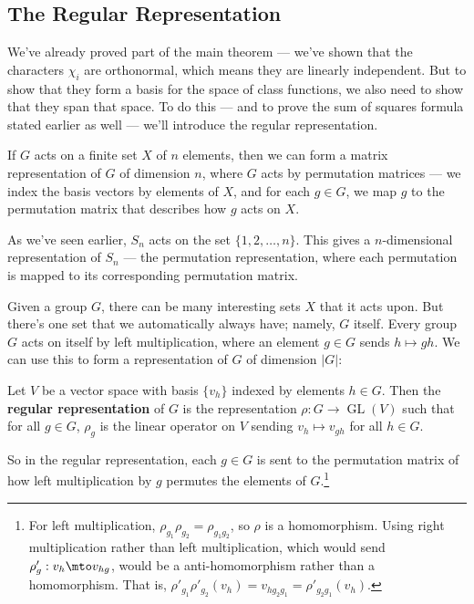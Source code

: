 \subsection{The Regular Representation}

We've already proved part of the main theorem --- we've shown that the characters $\chi_i$ are orthonormal, which means they are linearly independent. But to show that they form a basis for the space of class functions, we also need to show that they span that space. To do this --- and to prove the sum of squares formula stated earlier as well --- we'll introduce the regular representation. 

If $G$ acts on a finite set $X$ of $n$ elements, then we can form a matrix representation of $G$ of dimension $n$, where $G$ acts by permutation matrices --- we index the basis vectors by elements of $X$, and for each $g \in G$, we map $g$ to the permutation matrix that describes how $g$ acts on $X$. 

\begin{example}
    As we've seen earlier, $S_n$ acts on the set $\{1, 2, \ldots, n\}$. This gives a $n$-dimensional representation of $S_n$ --- the permutation representation, where each permutation is mapped to its corresponding permutation matrix. 
\end{example}

Given a group $G$, there can be many interesting sets $X$ that it acts upon. But there's one set that we automatically always have; namely, $G$ itself. Every group $G$ acts on itself by left multiplication, where an element $g \in G$ sends $h \mapsto gh$. We can use this to form a representation of $G$ of dimension $\lvert G \rvert$: 

\begin{definition}
    Let $V$ be a vector space with basis $\{v_h\}$ indexed by elements $h \in G$. Then the \textbf{regular representation} of $G$ is the representation $\rho : G \to \operatorname{GL}(V)$ such that for all $g \in G$, $\rho_g$ is the linear operator on $V$ sending $v_h \mapsto v_{gh}$ for all $h \in G$. 
\end{definition}

So in the regular representation, each $g \in G$ is sent to the permutation matrix of how left multiplication by $g$ permutes the elements of $G$.\footnote{For left multiplication, $\rho_{g_1}\rho_{g_2} = \rho_{g_1g_2}$, so $\rho$ is a homomorphism. Using right multiplication rather than left multiplication, which would send $\rho'_g: v_h \mto v_{hg}$, would be a anti-homomorphism rather than a homomorphism. That is, $\rho'_{g_1} \rho'_{g_2}(v_h) = v_{hg_2g_1} = \rho'_{g_2g_1}(v_h).$}

